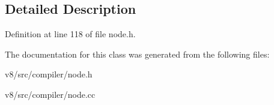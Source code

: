 \subsection{Detailed Description}


Definition at line 118 of file node.\+h.



The documentation for this class was generated from the following files\+:\begin{DoxyCompactItemize}
\item 
v8/src/compiler/node.\+h\item 
v8/src/compiler/node.\+cc\end{DoxyCompactItemize}
